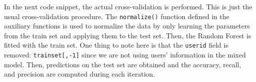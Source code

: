 \documentclass[
  11pt,
]{krantz}
\newenvironment{Shaded}{\begin{snugshade}}{\end{snugshade}}
\newcommand{\AttributeTok}[1]{\textcolor[rgb]{0.61,0.61,0.61}{#1}}
\newcommand{\CommentTok}[1]{\textcolor[rgb]{0.37,0.37,0.37}{\textit{#1}}}
\newcommand{\ControlFlowTok}[1]{\textcolor[rgb]{0.27,0.27,0.27}{\textbf{#1}}}
\newcommand{\DecValTok}[1]{\textcolor[rgb]{0.06,0.06,0.06}{#1}}
\newcommand{\FunctionTok}[1]{\textcolor[rgb]{0,0,0}{#1}}
\newcommand{\NormalTok}[1]{#1}
\newcommand{\OtherTok}[1]{\textcolor[rgb]{0.37,0.37,0.37}{#1}}
\newcommand{\SpecialCharTok}[1]{\textcolor[rgb]{0,0,0}{#1}}
\begin{document}
In the next code snippet, the actual cross-validation is performed. This is just the usual cross-validation procedure. The \texttt{normalize()} function defined in the auxiliary functions is used to normalize the data by only learning the parameters from the train set and applying them to the test set. Then, the Random Forest is fitted with the train set. One thing to note here is that the \texttt{userid} field is removed: \texttt{trainset{[},-1{]}} since we are not using users' information in the mixed model. Then, predictions on the test set are obtained and the accuracy, recall, and precision are computed during each iteration.

\begin{Shaded}
\end{Shaded}
\end{document}
